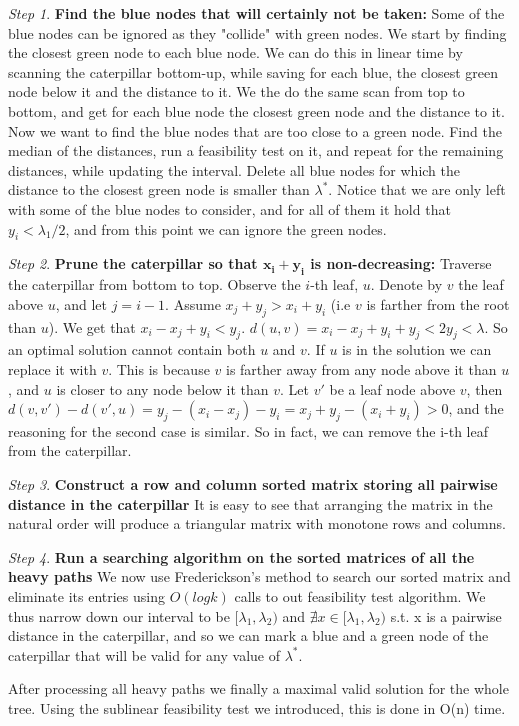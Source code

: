 \documentclass[11pt,a4paper]{article}
\theoremstyle{definition}
\theoremstyle{remark}
\newtheorem{step}{Step}[section]
\begin{document}
\begin{step}
\textbf{Find the blue nodes that will certainly not be taken:}
Some of the blue nodes can be ignored as they "collide" with green nodes. We start by finding the closest green node to each blue node. We can do this in linear time by scanning the caterpillar bottom-up, while saving for each blue, the closest green node below it and the distance to it. We the do the same scan from top to bottom, and get for each blue node the closest green node and the distance to it. Now we want to find the blue nodes that are too close to a green node. Find the median of the distances, run a feasibility test on it, and repeat for the remaining distances, while updating the interval. Delete all blue nodes for which the distance to the closest green node is smaller than $\lambda^*$.
Notice that we are only left with some of the blue nodes to consider, and for all of them it hold that $y_i < \lambda_1/2$, and from this point we can ignore the green nodes.
\end{step}
\begin{step}
\textbf{Prune the caterpillar so that $\pmb{x_i+y_i}$  is non-decreasing:}
Traverse the caterpillar from bottom to top. Observe the $i$-th leaf, $u$. Denote by $v$ the leaf above $u$, and let  $j=i-1$. Assume $x_j+y_j > x_i+y_i$ (i.e $v$ is farther from the root than $u$). We get that $x_i-x_j+y_i < y_j$. $d(u,v) = x_i-x_j+y_i+y_j < 2y_j < \lambda$. So an optimal solution cannot contain both $u$ and $v$. If $u$ is in the solution we can replace it with $v$. This is because $v$ is farther away from any node above it than $u$, and $u$ is closer to any node below it than $v$. Let $v'$ be a leaf node above $v$, then $d(v,v') - d(v',u) = y_j-(x_i-x_j)-y_i = x_j+y_j-(x_i+y_i) > 0$, and the reasoning for the second case is similar.
So in fact, we can remove the i-th leaf from the caterpillar.
\end{step}
\begin{step}
\textbf{Construct a row and column sorted matrix storing all pairwise distance in the caterpillar}
It is easy to see that arranging the matrix in the natural order will produce a triangular matrix with monotone rows and columns.
\end{step}
\begin{step}
\textbf{Run a searching algorithm on the sorted matrices of all the heavy paths}
We now use Frederickson's method to search our sorted matrix and eliminate its entries using $O(logk)$ calls to out feasibility test algorithm. We thus narrow down our interval to be $[\lambda_1,\lambda_2)$ and $\nexists x\in [\lambda_1,\lambda_2)$ s.t. x is a pairwise distance in the caterpillar, and so we can mark a blue and a green node of the caterpillar that will be valid for any value of $\lambda^*$.  %
\end{step}
After processing all heavy paths we finally a maximal valid solution for the whole tree. Using the sublinear feasibility test we introduced, this is done in O(n) time.
\end{document}
